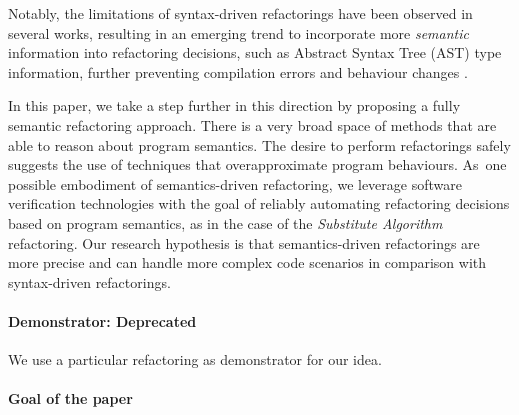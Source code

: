 \documentclass[runningheads,a4paper]{llncs}
\begin{document}
Notably, the limitations of syntax-driven refactorings have been observed
in several works, resulting in an emerging trend to incorporate more {\em semantic}
information into refactoring decisions, such as Abstract Syntax Tree (AST) 
type information,
further preventing compilation errors and behaviour changes
\cite{Steimann2011,Steimann2012Pilgrim,Steimann2011KollePilgrim}.


In this paper, we take a step further in this direction by proposing a
fully semantic refactoring approach.  There is a very broad space of
methods that are able to reason about program semantics.  The desire
to perform refactorings safely suggests the use of techniques that
overapproximate program behaviours.  As~one possible embodiment of
semantics-driven refactoring, we leverage software verification
technologies with the goal of reliably automating refactoring
decisions based on program semantics, as in the case of the {\em
  Substitute Algorithm} refactoring. Our research hypothesis is that
semantics-driven refactorings are more precise and can handle more
complex code scenarios in comparison with syntax-driven refactorings.



\paragraph{Demonstrator: Deprecated}

We use a particular refactoring as demonstrator for our idea.

\paragraph{Goal of the paper} 
\end{document}
